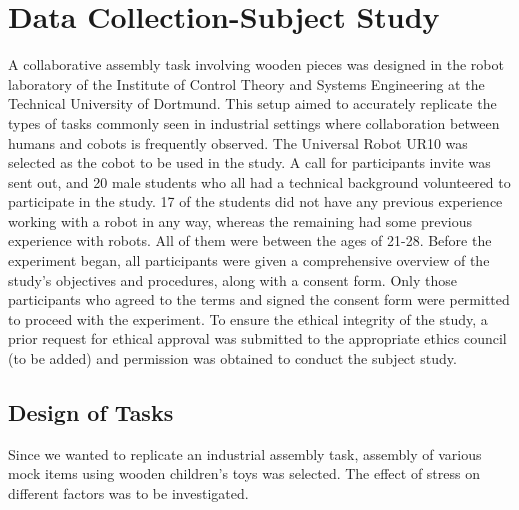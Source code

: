 \chapter{Data Collection-Subject Study}

A collaborative assembly task involving wooden pieces was designed in the robot laboratory of the Institute of Control Theory and Systems Engineering at the Technical University of Dortmund. This setup aimed to accurately replicate the types of tasks commonly seen in industrial settings where collaboration between humans and cobots is frequently observed. The Universal Robot UR10 was selected as the cobot to be used in the study. A call for participants invite was sent out, and 20 male students who all had a technical background volunteered to participate in the study. 17 of the students did not have any previous experience working with a robot in any way, whereas the remaining
had some previous experience with robots. All of them were between the ages of 21-28. Before the experiment began, all participants were given a comprehensive overview of the study's objectives and procedures, along with a consent form. Only those participants who agreed to the terms and signed the consent form were permitted to proceed with the experiment. To ensure the ethical integrity of the study, a prior request for ethical approval was submitted to the appropriate ethics council (to be added) and permission was obtained to conduct the subject study.

\section{Design of Tasks}
Since we wanted to replicate an industrial assembly task, assembly of various mock items using wooden children's toys was selected. The effect of stress on different factors was to be investigated.

